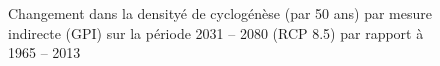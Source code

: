 \documentclass[aspectratio=169, usepdftitle=false, xcolor={dvipsnames}, 9pt,table]{beamer}
\begin{document}
\begin{frame}[t]
\begin{columns}[b]
\begin{column}{0.5\textwidth}
\begin{figure}[h]
                \caption{Changement dans la densityé de cyclogénèse (par 50 ans) par mesure \alert{indirecte} (GPI) sur la période 2031 -- 2080 (RCP 8.5) par
                rapport à 1965 -- 2013}
            \end{figure}
        \end{column}
    \end{columns}
\end{frame}

%    
\end{document}
